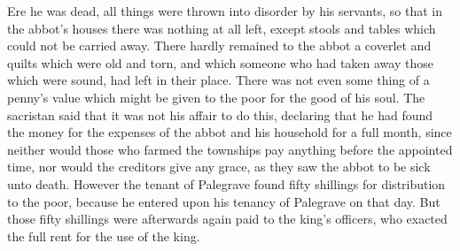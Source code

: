 \documentclass[10pt]{book}
\begin{document}
\begin{paracol}{2}
\switchcolumn

Ere he was dead, all things were thrown into disorder by his servants, so that in the abbot's houses there was nothing at all left, except stools and tables which could not be carried away. There hardly remained to the abbot a coverlet and quilts which were old and torn, and which someone who had taken away those which were sound, had left in their place. There was not even some thing of a penny's value which might be given to the poor for the good of his soul. The sacristan said that it was not his affair to do this, declaring that he had found the money for the expenses of the abbot and his household for a full month, since neither would those who farmed the townships pay anything before the appointed time, nor would the creditors give any grace, as they saw the abbot to be sick unto death. However the tenant of Palegrave found fifty shillings for distribution to the poor, because he entered upon his tenancy of Palegrave on that day. But those fifty shillings were afterwards again paid to the king's officers, who exacted the full rent for the use of the king.

\switchcolumn*


\end{paracol}
\end{document}
